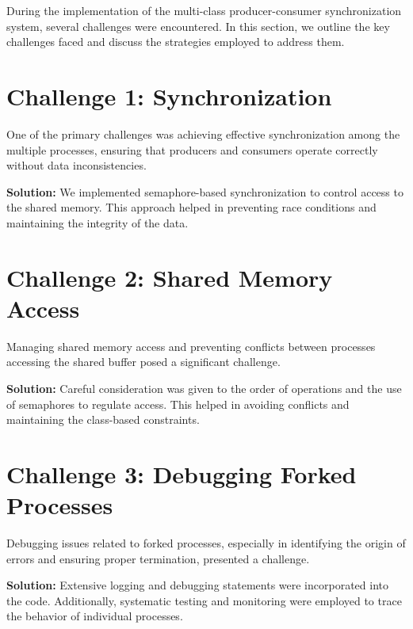 During the implementation of the multi-class producer-consumer synchronization system, several challenges were encountered. In this section, we outline the key challenges faced and discuss the strategies employed to address them.

\section{Challenge 1: Synchronization}

One of the primary challenges was achieving effective synchronization among the multiple processes, ensuring that producers and consumers operate correctly without data inconsistencies.

\textbf{Solution:} We implemented semaphore-based synchronization to control access to the shared memory. This approach helped in preventing race conditions and maintaining the integrity of the data.

\section{Challenge 2: Shared Memory Access}

Managing shared memory access and preventing conflicts between processes accessing the shared buffer posed a significant challenge.

\textbf{Solution:} Careful consideration was given to the order of operations and the use of semaphores to regulate access. This helped in avoiding conflicts and maintaining the class-based constraints.

\section{Challenge 3: Debugging Forked Processes}

Debugging issues related to forked processes, especially in identifying the origin of errors and ensuring proper termination, presented a challenge.

\textbf{Solution:} Extensive logging and debugging statements were incorporated into the code. Additionally, systematic testing and monitoring were employed to trace the behavior of individual processes.